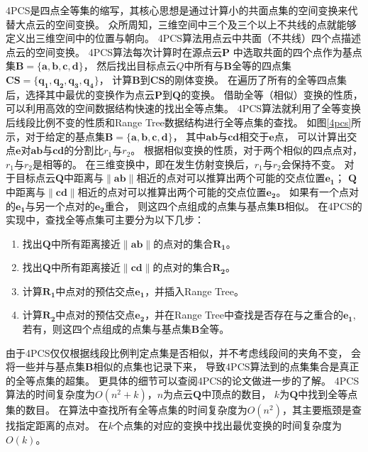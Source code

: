 4PCS是四点全等集的缩写，其核心思想是通过计算小的共面点集的空间变换来代替大点云的空间变换。
众所周知，三维空间中三个及三个以上不共线的点就能够定义出三维空间中的位置与朝向。
4PCS算法用点云中共面（不共线）四个点描述点云的空间变换。
4PCS算法每次计算时在源点云$\bm{P}$
中选取共面的四个点作为基点集$\bm{B}=\{\bm{a},\bm{b},\bm{c},\bm{d}\}$，
然后找出目标点云$Q$中所有与$\bm{B}$全等的四点集
$\bm{CS}=\{\bm{q_1},\bm{q_2},\bm{q_3},\bm{q_4}\}$，
计算$\bm{B}$到$\bm{CS}$的刚体变换。
在遍历了所有的全等四点集后，选择其中最优的变换作为点云$\bm{P}$到$\bm{Q}$的变换。
借助全等（相似）变换的性质，可以利用高效的空间数据结构快速的找出全等点集。
4PCS算法就利用了全等变换后线段比例不变的性质和Range Tree数据结构进行全等点集的查找。
如图\ref{4pcs}所示，对于给定的基点集$\bm{B}=\{\bm{a},\bm{b},\bm{c},\bm{d}\}$，
其中$\bm{ab}$与$\bm{cd}$相交于$\bm{e}$点，
可以计算出交点$\bm{e}$对$\bm{ab}$与$\bm{cd}$的分割比$r_1$与$r_2$。
根据相似变换的性质，对于两个相似的四点点对，$r_1$与$r_2$是相等的。
在三维变换中，即在发生仿射变换后，$r_1$与$r_2$会保持不变。
对于目标点云$\bm{Q}$中距离与$\|\bm{ab}\|$相近的点对可以推算出两个可能的交点位置$\bm{e_1}$；
$\bm{Q}$中距离与$\|\bm{cd}\|$相近的点对可以推算出两个可能的交点位置$\bm{e_2}$。
如果有一个点对的$\bm{e_1}$与另一个点对的$\bm{e_2}$重合，
则这四个点组成的点集与基点集$\bm{B}$相似。
在4PCS的实现中，查找全等点集可主要分为以下几步：
\begin{enumerate}
    \item   找出$\bm{Q}$中所有距离接近$\|\bm{ab}\|$的点对的集合$\bm{R_1}$。
    \item   找出$\bm{Q}$中所有距离接近$\|\bm{cd}\|$的点对的集合$\bm{R_2}$。
    \item   计算$\bm{R_1}$中点对的预估交点$\bm{e_1}$，并插入Range Tree。
    \item   计算$\bm{R_2}$中点对的预估交点$\bm{e_2}$，并在Range Tree中查找是否存在与之重合的$\bm{e_1}$,
            若有，则这四个点组成的点集与基点集$\bm{B}$全等。
  \end{enumerate}
由于4PCS仅仅根据线段比例判定点集是否相似，并不考虑线段间的夹角不变，
会将一些并与基点集$\bm{B}$相似的点集也记录下来，
导致4PCS算法到的点集集合是真正的全等点集的超集。
更具体的细节可以查阅4PCS的论文做进一步的了解。
4PCS算法的时间复杂度为$O(n^2+k)$，$n$为点云$\bm{Q}$中顶点的数目，
$k$为$\bm{Q}$中找到全等点集的数目。
在算法中查找所有全等点集的时间复杂度为$O(n^2)$，其主要瓶颈是查找指定距离的点对。
在$k$个点集的对应的变换中找出最优变换的时间复杂度为$O(k)$。

